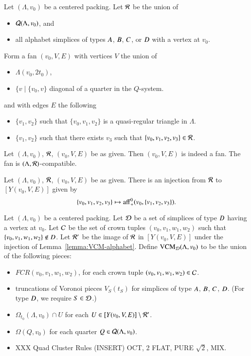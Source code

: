 Let $(\Lambda,v_0)$ be a centered packing.  Let ${\mathcal R}$ be the union of 
\begin{itemize}
  \item ${\mathcal Q}(\Lambda,v_0)$, and
  \item all alphabet simplices of types $A$, $B$, $C$, or $D$ with a vertex at $v_0$.  
\end{itemize}
Form a fan $(v_0,V,E)$ with vertices $V$ the union of
\begin{itemize}
  \item $\Lambda(v_0,2t_0)$,
  \item $\{v \mid \{v_0,v\}$  diagonal of a quarter in the  $Q$-system.
\end{itemize}
and with edges $E$ the following
\begin{itemize}
  \item $\{v_1,v_2\}$ such that $\{v_0,v_1,v_2\}$ is a quasi-regular triangle in $\Lambda$.
  \item $\{v_1,v_2\}$ such that there exists $v_3$ such that $\{v_0,v_1,v_2,v_3\}\in{\mathcal R}$.
\end{itemize}

\begin{lemma}
Let $(\Lambda,v_0)$, ${\mathcal R}$, $(v_0,V,E)$ be as given. Then $(v_0,V,E)$ is indeed a fan.
The fan is $(\Lambda,{\mathcal R})$-compatible.  
\end{lemma}




\begin{lemma}
Let $(\Lambda,v_0)$, ${\mathcal R}$, $(v_0,V,E)$ be as given.  There is an injection from ${\mathcal R}$
to $[Y(v_0,V,E)]$ given by 
  $$
  \{v_0,v_1,v_2,v_3\}\mapsto {\operatorname{aff}}_+^0(v_0,\{v_1,v_2,v_3\}).
  $$
\end{lemma}

\begin{definition}
Let $(\Lambda,v_0)$ be  a centered packing.   
Let ${\mathcal D}$ be a set of simplices of type $D$ having a vertex at $v_0$.  Let ${\mathcal C}$ be the
set of crown tuples $(v_0,v_1,w_1,w_2)$ such that $\{v_0,v_1,w_1,w_2\}\not\in D$. 
Let ${\mathcal R}'$ be the image
of ${\mathcal R}$ in $[Y(v_0,V,E)]$ under the injection of Lemma~\ref{lemma:VCM-alphabet}.
Define ${\operatorname{VCM}}_{{\mathcal D}}(\Lambda,v_0)$ to be the union of the following pieces:
    \begin{itemize}
    \item $FCR(v_0,v_1,w_1,w_2)$, for each crown tuple $(v_0,v_1,w_1,w_2)\in{\mathcal C}$.
    \item truncations of Voronoi pieces $V_S(t_S)$ for simplices of type
        $A$, $B$,  $C$, $D$.  (For type $D$, we require $S\in {\mathcal D}$.)
    \item $\Omega_{t_0}(\Lambda,v_0)\cap U$ for each $U\in[Y(v_0,V,E)]\setminus {\mathcal R}'$.
    \item $\Omega(Q,v_0)$ for each quarter $Q\in{\mathcal Q}(\Lambda,v_0)$.
    \item XXX Quad Cluster Rules (INSERT) OCT, 2 FLAT, PURE $\sqrt2$, MIX.
    \end{itemize}
\end{definition}

